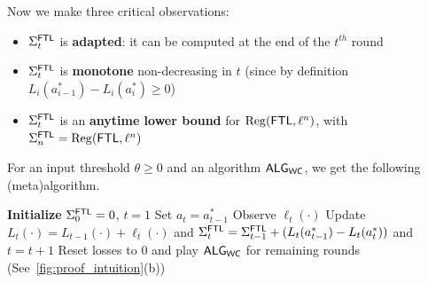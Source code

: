 Now we make three critical observations: 
\begin{itemize}
    \item $\Sigma^{\mathsf{FTL}}_t$ is \textbf{adapted}: it can be computed at the end of the $t^{th}$ round %
    \item $\Sigma^{\mathsf{FTL}}_t$ is \textbf{monotone} non-decreasing in $t$ (since by definition $L_i(a^*_{i-1}) - L_i(a^*_i) \ge 0$)
    \item $\Sigma^{\mathsf{FTL}}_t$ is an \textbf{anytime lower bound} for $\mathrm{Reg}(\mathsf{FTL},\ell^n)$, with $\Sigma^{\mathsf{FTL}}_n = \mathrm{Reg}(\mathsf{FTL}, \ell^n)$
\end{itemize}
For an input threshold $\theta \ge 0$ and an algorithm $\mathsf{ALG}_{\mathsf{WC}}$, we get the following (meta)algorithm.

\begin{algorithm}[ht] 
\label{alg:bob}
\SetAlgoNoLine
\caption{Switching via Monotone Adapted Regret Traces ($\bob$)}
\label{alg:bob}
\textbf{Initialize} $\Sigma^{\mathsf{FTL}}_0=0$, $t=1$ \;
{
    Set $a_t = a_{t-1}^{*}$%
    Observe $\ell_t(\cdot)$\; 
    Update $L_t(\cdot)=L_{t-1}(\cdot)+\ell_t(\cdot)$ and $\Sigma^{\mathsf{FTL}}_t=\Sigma^{\mathsf{FTL}}_{t-1}+(L_t(a_{t-1}^{*})-L_t(a_{t}^{*}))$ and $t = t+1$\;
}
Reset losses to $0$ and play $\mathsf{ALG}_{\mathsf{WC}}$ for remaining rounds (See~\cref{fig:proof_intuition}(b)) \;
\end{algorithm}

